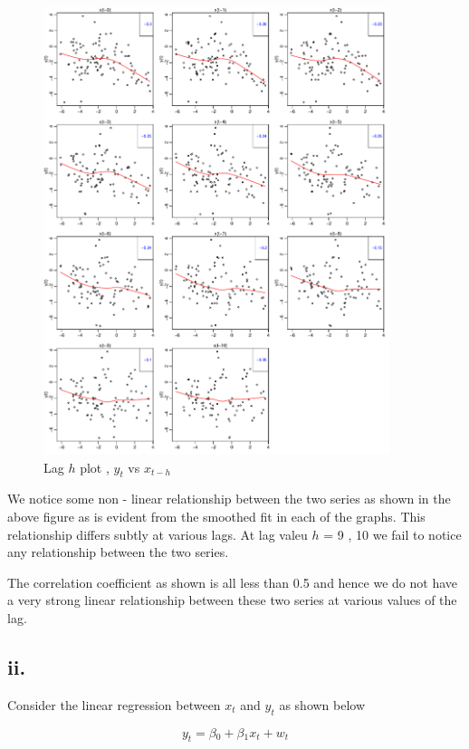 \documentclass{article}
\begin{document}
\begin{figure}
	\centering
	\includegraphics[width=0.9\textwidth]{lagplots_10}
	\caption{Lag $h$ plot , $y_t$ vs $x_{t-h}$}
	\label{fig3:lag10}
\end{figure}
\newpage

We notice some non - linear relationship between the two series as shown in the above figure as is evident from the smoothed fit in each of the graphs. This relationship differs subtly at various lags. At lag valeu $h$ = 9 , 10 we fail to notice any relationship between the two series. 

The correlation coefficient as shown is all less than 0.5 and hence we do not have a very strong linear relationship between these
two series at various values of the lag. 

\subsection{ii.}

Consider the linear regression between $x_t$ and $y_t$ as shown below 


\[
y_t = \beta{_0} + \beta{_1}x_t + w_t
\]
\end{document}

